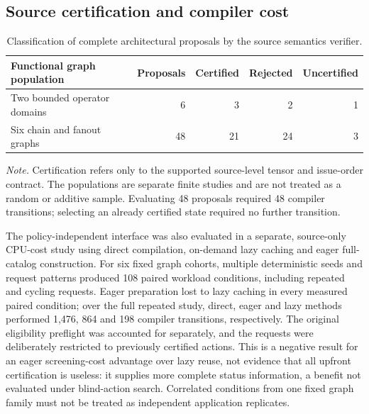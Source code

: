 \documentclass{article}
\newcommand{\tablenote}[1]{\par\vspace{3pt}\begin{minipage}{\linewidth}\footnotesize\emph{Note.} #1\end{minipage}}
\begin{document}
\subsection{Source certification and compiler cost}
\begin{table}[H]
\centering
\caption{Classification of complete architectural proposals by the source semantics verifier.}
\label{tab:decision-results}
\small
\renewcommand{\arraystretch}{1.14}
\setlength{\tabcolsep}{3.6pt}
\begin{tabularx}{\linewidth}{@{}Xrrrr@{}}
\toprule
Functional graph population & Proposals & Certified & Rejected & Uncertified \\
\midrule
Two bounded operator domains & 6 & 3 & 2 & 1 \\
Six chain and fanout graphs & 48 & 21 & 24 & 3 \\
\bottomrule
\end{tabularx}
\tablenote{Certification refers only to the supported source-level tensor and issue-order contract. The populations are separate finite studies and are not treated as a random or additive sample. Evaluating 48 proposals required 48 compiler transitions; selecting an already certified state required no further transition.}
\end{table}

The policy-independent interface was also evaluated in a separate, source-only CPU-cost study using direct compilation, on-demand lazy caching and eager full-catalog construction. For six fixed graph cohorts, multiple deterministic seeds and request patterns produced 108 paired workload conditions, including repeated and cycling requests. Eager preparation lost to lazy caching in every measured paired condition; over the full repeated study, direct, eager and lazy methods performed 1,476, 864 and 198 compiler transitions, respectively. The original eligibility preflight was accounted for separately, and the requests were deliberately restricted to previously certified actions. This is a negative result for an eager screening-cost advantage over lazy reuse, not evidence that all upfront certification is useless: it supplies more complete status information, a benefit not evaluated under blind-action search. Correlated conditions from one fixed graph family must not be treated as independent application replicates.
\end{document}

